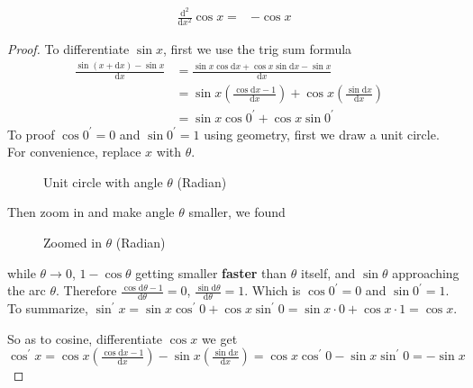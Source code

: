 \begin{enumerate}
\begin{align*}
            \frac{\mathrm{d}^2}{\mathrm{d}x^2}\cos x= & -\cos x
        \end{align*}
        \begin{proof}
            To differentiate \(\sin x\), first we use the trig sum formula
            \begin{align*}
                \frac{\sin(x+\mathrm{d}x)-\sin x}{\mathrm{d}x} & =\frac{\sin x\cos\mathrm{d}x+\cos x\sin\mathrm{d}x-\sin x}{\mathrm{d}x} & \\
                                                                & =\sin x\left(\frac{\cos\mathrm{d}x-1}{\mathrm{d}x}\right)+\cos x\left(\frac{\sin\mathrm{d}x}{\mathrm{d}x}\right)\\
                                                                & =\sin x\cos0^\prime+\cos x\sin0^\prime
            \end{align*}
            To proof \(\cos0^\prime=0\) and \(\sin0^\prime=1\) using geometry, first we draw a unit circle. For convenience, replace \(x\) with \(\theta\).
            \begin{figure}[H]
                \centering
                \caption{Unit circle with angle \(\theta\) (Radian)}
            \end{figure}
            Then zoom in and make angle \(\theta\) smaller, we found
            \begin{figure}[H]
                \centering
                \caption{Zoomed in \(\theta\) (Radian)}
            \end{figure}
            while \(\theta\to0\), \(1-\cos\theta\) getting smaller \textbf{faster} than \(\theta\) itself, and \(\sin\theta\) approaching the arc \(\theta\). Therefore \(\frac{\cos\mathrm{d}\theta-1}{\mathrm{d}\theta}=0\), \(\frac{\sin\mathrm{d}\theta}{\mathrm{d}\theta}=1\). Which is \(\cos0^\prime=0\) and \(\sin0^\prime=1\).\\
            \indent To summarize, \(\sin^\prime x=\sin x\cos^\prime 0+\cos x\sin^\prime 0=\sin x\cdot0+\cos x\cdot1=\cos x\).\par
            So as to cosine, differentiate \(\cos x\) we get \(\cos^\prime x=\cos x\left(\frac{\cos\mathrm{d}x-1}{\mathrm{d}x}\right)-\sin x\left(\frac{\sin\mathrm{d}x}{\mathrm{d}x}\right)=\cos x\cos^\prime 0-\sin x\sin^\prime 0=-\sin x\)
        \end{proof}
\end{enumerate}
